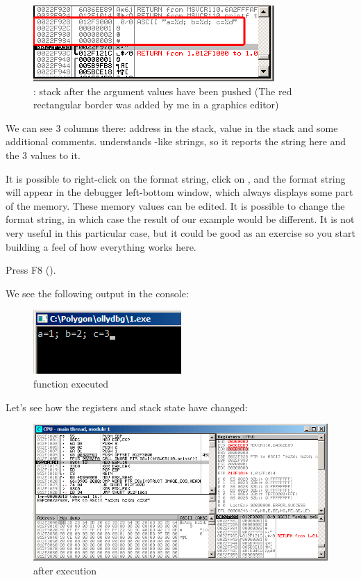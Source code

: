\begin{figure}[H]
\centering
\includegraphics[scale=\NormalScale]{patterns/03_printf/x86/olly3_stack.png}
\caption{\olly: stack after the argument values have been pushed (The red rectangular border was added by me in a graphics editor)}
\end{figure}

We can see 3 columns there: address in the stack, value in the stack and some additional \olly comments. 
\olly understands \printf{}-like strings, so it reports the string here and the 3 values  to it.

It is possible to right-click on the format string, click on ,
and the format string will appear in the debugger left-bottom window, which always displays some part of the memory.
These memory values can be edited.
It is possible to change the format string, in which case the result of our example would be different.
It is not very useful in this particular case, but it could be good as an exercise so you start building a feel of how everything works here.

\clearpage
Press F8 (\stepover).

We see the following output in the console:

\begin{figure}[H]
\centering
\includegraphics[scale=\NormalScale]{patterns/03_printf/x86/olly3_console.png}
\caption{\printf function executed}
\end{figure}

Let's see how the registers and stack state have changed: 

\begin{figure}[H]
\centering
\includegraphics[scale=\FigScale]{patterns/03_printf/x86/olly3_3.png}
\caption{\olly after \printf{} execution}
\label{fig:printf3_olly_3}
\end{figure}


